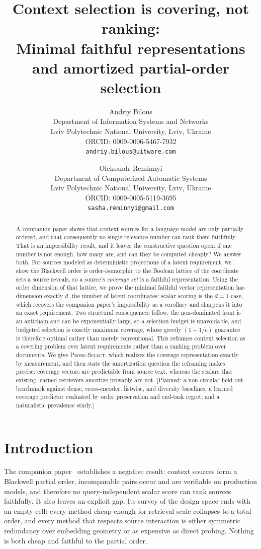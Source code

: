 \documentclass[11pt]{article}
\title{Context selection is covering, not ranking:\\
Minimal faithful representations and amortized partial-order selection}
\author{%
  Andriy Bilous \\
  Department of Information Systems and Networks \\
  Lviv Polytechnic National University, Lviv, Ukraine \\
  ORCID: 0009-0006-5467-7932 \\
  \texttt{andriy.bilous@uitware.com}
  \and
  Oleksandr Reminnyi \\
  Department of Computerized Automatic Systems \\
  Lviv Polytechnic National University, Lviv, Ukraine \\
  ORCID: 0009-0005-5119-3695 \\
  \texttt{sasha.reminnyi@gmail.com}
}
\date{}
\theoremstyle{plain}
\theoremstyle{definition}
\theoremstyle{remark}
\begin{document}
\maketitle

\begin{abstract}
A companion paper shows that context sources for a language model are only partially ordered, and
that consequently no single relevance number can rank them faithfully. That is an impossibility
result, and it leaves the constructive question open: if one number is not enough, how many are,
and can they be computed cheaply? We answer both. For sources modeled as deterministic projections
of a latent requirement, we show the Blackwell order is order-isomorphic to the Boolean lattice of
the coordinate sets a source reveals, so a source's \emph{coverage set} is a faithful
representation. Using the order dimension of that lattice, we prove the minimal faithful vector
representation has dimension exactly $d$, the number of latent coordinates; scalar scoring is the
$d=1$ case, which recovers the companion paper's impossibility as a corollary and sharpens it into
an exact requirement. Two structural consequences follow: the non-dominated front is an antichain
and can be exponentially large, so a selection budget is unavoidable, and budgeted selection is
exactly maximum coverage, whose greedy $(1-1/e)$ guarantee is therefore optimal rather than merely
conventional. This reframes context selection as a covering problem over latent requirements rather
than a ranking problem over documents. We give \textsc{Probe-Select}, which realizes the coverage
representation exactly by measurement, and then state the amortization question the reframing makes
precise: coverage vectors are predictable from source text, whereas the scalars that existing
learned retrievers amortize provably are not. [Planned: a non-circular held-out benchmark against
dense, cross-encoder, listwise, and diversity baselines; a learned coverage predictor evaluated by
order preservation and end-task regret; and a naturalistic prevalence study.]
\end{abstract}

\section{Introduction}
\label{sec:intro}

The companion paper~\citep{companion} establishes a negative result: context sources form a
Blackwell partial order, incomparable pairs occur and are verifiable on production models, and
therefore no query-independent scalar score can rank sources faithfully. It also leaves an explicit
gap. Its survey of the design space ends with an empty cell: every method cheap enough for
retrieval scale collapses to a total order, and every method that respects source interaction is
either symmetric redundancy over embedding geometry or as expensive as direct probing. Nothing is
both cheap and faithful to the partial order.
\end{document}

